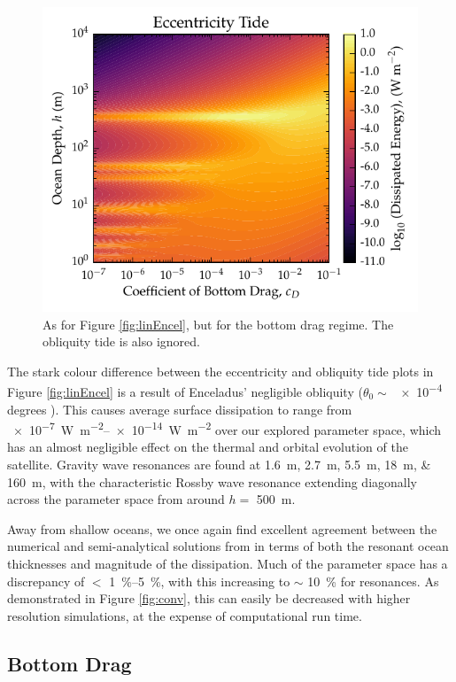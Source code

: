 \begin{figure}[!t]
    \centering
    \includegraphics[width=0.95\linewidth]{Figures/enceladus_bottom}
\caption{As for Figure \ref{fig:linEncel}, but for the bottom drag regime. The obliquity tide is also ignored. \label{fig:botEncel}}
\end{figure}

The stark colour difference between the eccentricity and obliquity tide plots in Figure \ref{fig:linEncel} is a result of Enceladus' negligible obliquity ($\theta_0 \sim$ \num{e-4} degrees \citep{chen2013tidal, baland2016obliquity}). This causes average surface dissipation to range from \SIrange{e-7}{e-14}{\watt\per\square\metre} over our explored parameter space, which has an almost negligible effect on the thermal and orbital evolution of the satellite. Gravity wave resonances are found at \SIlist{1.6;2.7;5.5;18;160}{\metre}, with the characteristic Rossby wave resonance extending diagonally across the parameter space from around $h=$ \SI{500}{\metre}.

Away from shallow oceans, we once again find excellent agreement between the numerical and semi-analytical solutions from \citet{matsuyama2014tidal} in terms of both the resonant ocean thicknesses and magnitude of the dissipation. Much of the parameter space has a discrepancy of $<$ \SIrange{1}{5}{\percent}, with this increasing to $\sim$ \SI{10}{\percent} for resonances. As demonstrated in Figure \ref{fig:conv}, this can easily be decreased with higher resolution simulations, at the expense of computational run time.


\subsection{Bottom Drag}

